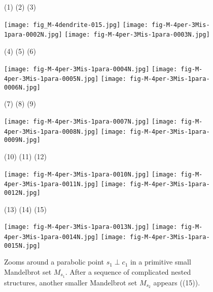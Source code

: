 \begin{figure}[htbp]
\hskip -40mm
{\small (1)}
\hskip 43mm
{\small (2)}
\hskip 43mm
{\small (3)}

\texttt{[image: fig\_M-4dendrite-015.jpg]} \hskip 5mm
\texttt{[image: fig-M-4per-3Mis-1para-0002N.jpg]} \hskip 5mm
\texttt{[image: fig-M-4per-3Mis-1para-0003N.jpg]} \hskip 5mm

\hskip -40mm
{\small (4)}
\hskip 43mm
{\small (5)}
\hskip 43mm
{\small (6)}

\texttt{[image: fig-M-4per-3Mis-1para-0004N.jpg]} \hskip 5mm
\texttt{[image: fig-M-4per-3Mis-1para-0005N.jpg]} \hskip 5mm
\texttt{[image: fig-M-4per-3Mis-1para-0006N.jpg]} \hskip 5mm


\hskip -40mm
{\small (7)}
\hskip 43mm
{\small (8)}
\hskip 43mm
{\small (9)}

\texttt{[image: fig-M-4per-3Mis-1para-0007N.jpg]} \hskip 5mm
\texttt{[image: fig-M-4per-3Mis-1para-0008N.jpg]} \hskip 5mm
\texttt{[image: fig-M-4per-3Mis-1para-0009N.jpg]} \hskip 5mm


\hskip -38mm
{\small (10)}
\hskip 41mm
{\small (11)}
\hskip 41mm
{\small (12)}

\texttt{[image: fig-M-4per-3Mis-1para-0010N.jpg]} \hskip 5mm
\texttt{[image: fig-M-4per-3Mis-1para-0011N.jpg]} \hskip 5mm
\texttt{[image: fig-M-4per-3Mis-1para-0012N.jpg]} \hskip 5mm



\hskip -38mm
{\small (13)}
\hskip 41mm
{\small (14)}
\hskip 41mm
{\small (15)}

\texttt{[image: fig-M-4per-3Mis-1para-0013N.jpg]} \hskip 5mm
\texttt{[image: fig-M-4per-3Mis-1para-0014N.jpg]} \hskip 5mm
\texttt{[image: fig-M-4per-3Mis-1para-0015N.jpg]} \hskip 5mm

\caption{\small Zooms around a parabolic point $s_1 \perp c_1$ 
in a primitive small Mandelbrot set $M_{s_1}$. After a sequence of 
complicated nested structures, another smaller Mandelbrot set 
$M_{s_2}$ appears ((15)).}
\label{figures of a complicated structure}
\end{figure}












